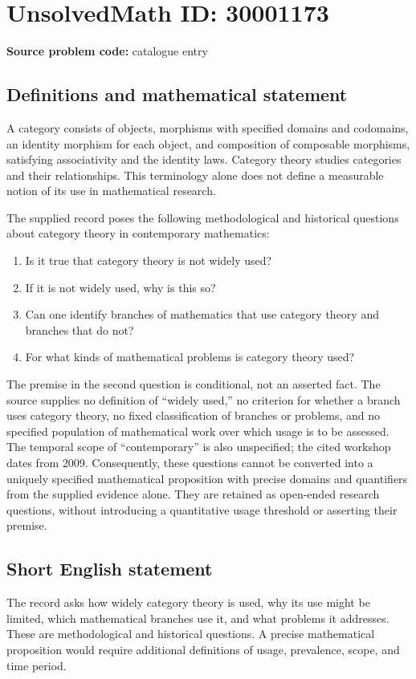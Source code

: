 \documentclass[11pt]{article}
\begin{document}
\section*{UnsolvedMath ID: 30001173}
\textbf{Source problem code:} catalogue entry
\subsection{Definitions and mathematical statement}
A category consists of objects, morphisms with specified domains and codomains, an identity morphism for each object, and composition of composable morphisms, satisfying associativity and the identity laws. Category theory studies categories and their relationships. This terminology alone does not define a measurable notion of its use in mathematical research.

The supplied record poses the following methodological and historical questions about category theory in contemporary mathematics:
\begin{enumerate}
\item Is it true that category theory is not widely used?
\item If it is not widely used, why is this so?
\item Can one identify branches of mathematics that use category theory and branches that do not?
\item For what kinds of mathematical problems is category theory used?
\end{enumerate}
The premise in the second question is conditional, not an asserted fact. The source supplies no definition of ``widely used,'' no criterion for whether a branch uses category theory, no fixed classification of branches or problems, and no specified population of mathematical work over which usage is to be assessed. The temporal scope of ``contemporary'' is also unspecified; the cited workshop dates from 2009. Consequently, these questions cannot be converted into a uniquely specified mathematical proposition with precise domains and quantifiers from the supplied evidence alone. They are retained as open-ended research questions, without introducing a quantitative usage threshold or asserting their premise.
\subsection{Short English statement}
The record asks how widely category theory is used, why its use might be limited, which mathematical branches use it, and what problems it addresses. These are methodological and historical questions. A precise mathematical proposition would require additional definitions of usage, prevalence, scope, and time period.
\end{document}

